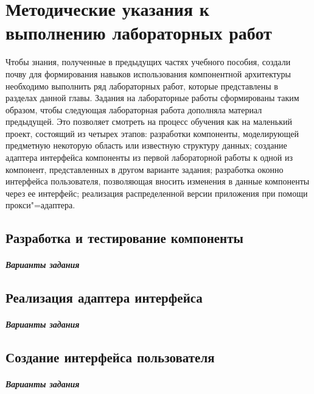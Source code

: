 \documentclass[a4paper,openany,twoside,draft]{book}
\begin{document}
\clearpage
\chapter{Методические указания к выполнению лабораторных работ}
\label{cha:labs}

Чтобы знания, полученные в предыдущих частях учебного пособия, создали почву для формирования навыков использования компонентной архитектуры необходимо выполнить ряд лабораторных работ, которые представлены в разделах данной главы.  Задания на лабораторные работы сформированы таким образом, чтобы следующая лабораторная работа дополняла материал предыдущей.  Это позволяет смотреть на процесс обучения как на маленький проект, состоящий из четырех этапов: разработки компоненты, моделирующей предметную некоторую область или известную структуру данных; создание адаптера интерфейса компоненты из первой лабораторной работы к одной из компонент, представленных в другом варианте задания; разработка оконно интерфейса пользователя, позволяющая вносить изменения в данные компоненты через ее интерфейс; реализация распределенной версии приложения при помощи прокси"=адаптера.

\section{Разработка и тестирование компоненты}
\label{sec:labcomp}
\newpage

\paragraph{Варианты задания}
\newpage

\section{Реализация адаптера интерфейса}
\label{sec:labadapter}
\newpage

\paragraph{Варианты задания}
\newpage

\section{Создание интерфейса пользователя}
\label{sec:labinterface}

\newpage
\paragraph{Варианты задания}
\newpage
\end{document}
